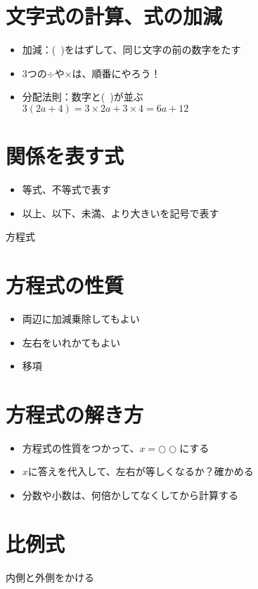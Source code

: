 \documentclass{jsarticle}
\begin{document}
\section{文字式の計算、式の加減}
\begin{itemize}
\item 加減：(\ )をはずして、同じ文字の前の数字をたす
\item 3つの$\div$や$\times$は、順番にやろう！
\item 分配法則：数字と(\ )が並ぶ\\ 
$3(2a+4)=3 \times 2a + 3 \times 4 =6a+12$
\end{itemize}

\section{関係を表す式}
\begin{itemize}
\item 等式、不等式で表す
\item 以上、以下、未満、より大きいを記号で表す
\end{itemize}

\newpage

{\LARGE \noindent 方程式}

\section{方程式の性質}
\begin{itemize}
\item 両辺に加減乗除してもよい
\item 左右をいれかてもよい
\item 移項
\end{itemize}

\section{方程式の解き方}
\begin{itemize}
\item 方程式の性質をつかって、$x=○○$にする
\item $x$に答えを代入して、左右が等しくなるか？確かめる
\item 分数や小数は、何倍かしてなくしてから計算する
\end{itemize}

\section{比例式}
内側と外側をかける
\end{document}
